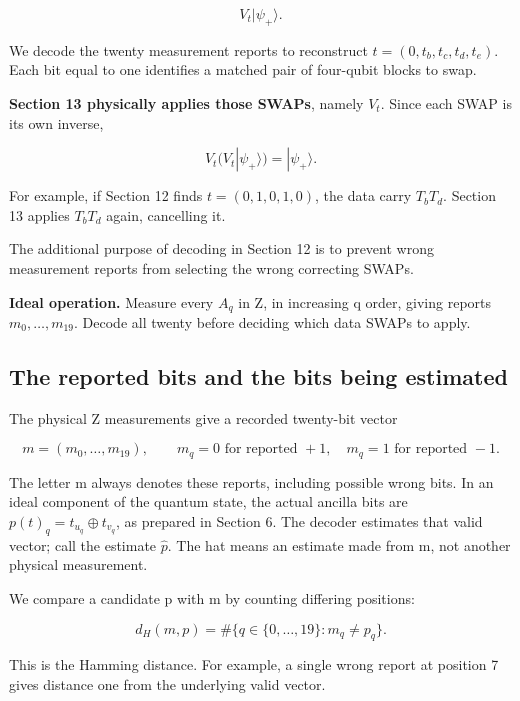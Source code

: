 \documentclass[11pt]{article}
\begin{document}
\[
V_t|\psi_+\rangle.
\]

We decode the twenty measurement reports to reconstruct \(t=(0,t_b,t_c,t_d,t_e)\). Each bit equal to one identifies a matched pair of four-qubit blocks to swap.

\textbf{Section 13 physically applies those SWAPs}, namely \(V_t\). Since each SWAP is its own inverse,

\[
V_t\bigl(V_t|\psi_+\rangle\bigr)=|\psi_+\rangle.
\]

For example, if Section 12 finds \(t=(0,1,0,1,0)\), the data carry \(T_bT_d\). Section 13 applies \(T_bT_d\) again, cancelling it.

The additional purpose of decoding in Section 12 is to prevent wrong measurement reports from selecting the wrong correcting SWAPs.

\textbf{Ideal operation.} Measure every \(A_q\) in Z, in increasing q order, giving reports \(m_0,\ldots,m_{19}\). Decode all twenty before deciding which data SWAPs to apply.

\subsection{The reported bits and the bits being estimated}
The physical Z measurements give a recorded twenty-bit vector

\[
m=(m_0,\ldots,m_{19}),\qquad
m_q=0\text{ for reported }+1,\quad m_q=1\text{ for reported }-1.
\]

The letter m always denotes these reports, including possible wrong bits. In an ideal component of the quantum state, the actual ancilla bits are \(p(t)_q=t_{u_q}\oplus t_{v_q}\), as prepared in Section 6. The decoder estimates that valid vector; call the estimate \(\widehat p\). The hat means an estimate made from m, not another physical measurement.

We compare a candidate p with m by counting differing positions:

\[
d_H(m,p)=\#\{q\in\{0,\ldots,19\}:m_q\ne p_q\}.
\]

This is the Hamming distance. For example, a single wrong report at position 7 gives distance one from the underlying valid vector.

\begin{center}\begin{minipage}{\linewidth}

\end{minipage}\end{center}
\end{document}
